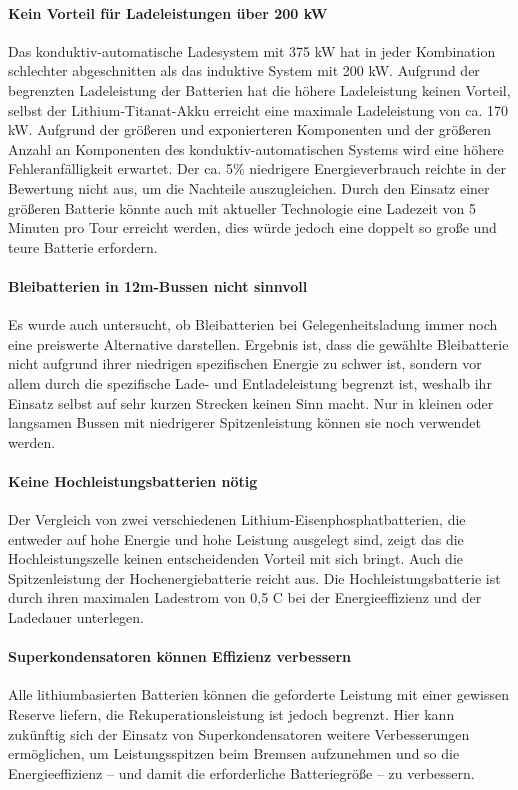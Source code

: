 \paragraph{Kein Vorteil für Ladeleistungen über 200 kW} Das konduktiv-automatische Ladesystem mit 375 kW hat in jeder Kombination schlechter abgeschnitten als das induktive System mit 200 kW. Aufgrund der begrenzten Ladeleistung der Batterien hat die höhere Ladeleistung keinen Vorteil, selbst der Lithium-Titanat-Akku erreicht eine maximale Ladeleistung von ca. 170 kW. Aufgrund der größeren und exponierteren Komponenten und der größeren Anzahl an Komponenten des konduktiv-automatischen Systems wird eine höhere Fehleranfälligkeit erwartet. Der ca. 5\% niedrigere Energieverbrauch reichte in der Bewertung nicht aus, um die Nachteile auszugleichen. Durch den Einsatz einer größeren Batterie könnte auch mit aktueller Technologie eine Ladezeit von 5 Minuten pro Tour erreicht werden, dies würde jedoch eine doppelt so große und teure Batterie erfordern.

\paragraph{Bleibatterien in 12m-Bussen nicht sinnvoll} Es wurde auch untersucht, ob Bleibatterien bei Gelegenheitsladung immer noch eine preiswerte Alternative darstellen. Ergebnis ist, dass die gewählte Bleibatterie nicht aufgrund ihrer niedrigen spezifischen Energie zu schwer ist, sondern vor allem durch die spezifische Lade- und Entladeleistung begrenzt ist, weshalb ihr Einsatz selbst auf sehr kurzen Strecken keinen Sinn macht. Nur in kleinen oder langsamen Bussen mit niedrigerer Spitzenleistung können sie noch verwendet werden.

\paragraph{Keine Hochleistungsbatterien nötig} Der Vergleich von zwei verschiedenen Lithium-Eisenphosphatbatterien, die entweder auf hohe Energie und hohe Leistung ausgelegt sind, zeigt das die Hochleistungszelle keinen entscheidenden Vorteil mit sich bringt. Auch die Spitzenleistung der Hochenergiebatterie reicht aus. Die Hochleistungsbatterie ist durch ihren maximalen Ladestrom von 0,5 C bei  der Energieeffizienz und der Ladedauer unterlegen.

\paragraph{Superkondensatoren können Effizienz verbessern} Alle lithiumbasierten Batterien können die geforderte Leistung mit einer gewissen Reserve liefern, die Rekuperationsleistung ist jedoch begrenzt. Hier kann zukünftig sich der Einsatz von Superkondensatoren weitere Verbesserungen ermöglichen, um Leistungsspitzen beim Bremsen aufzunehmen und so die Energieeffizienz – und damit die erforderliche Batteriegröße – zu verbessern.

